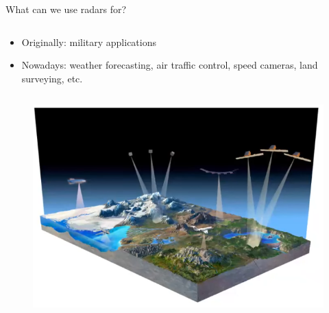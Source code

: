 \begin{columnframe}{What can we use radars for?}
    \begin{column}{0.5\textwidth}
        \begin{itemize}
            \item Originally: military applications
            \item Nowadays: weather forecasting, air traffic control, speed cameras, land surveying, etc.
        \end{itemize}
    \end{column}
    \begin{column}{0.5\textwidth}
        \begin{figure}
            \centering
            \includegraphics[width=\textwidth]{images/satellite_demo.png}
        \end{figure}
    \end{column}
\end{columnframe}



